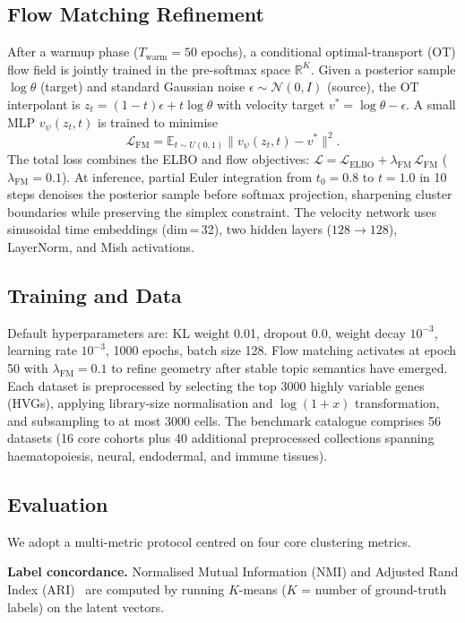 \documentclass[biology,article,submit,pdftex,moreauthors]{Definitions/mdpi}
\begin{document}
\subsection{Flow Matching Refinement}
After a warmup phase ($T_\text{warm}{=}50$ epochs), a conditional optimal-transport (OT) flow field is jointly trained in the pre-softmax space $\mathbb{R}^K$. Given a posterior sample $\log\theta$ (target) and standard Gaussian noise $\epsilon \sim \mathcal{N}(0,I)$ (source), the OT interpolant is $z_t = (1{-}t)\epsilon + t\log\theta$ with velocity target $v^* = \log\theta - \epsilon$. A small MLP $v_\psi(z_t, t)$ is trained to minimise
\[
  \mathcal{L}_\text{FM} = \mathbb{E}_{t\sim U(0,1)} \bigl\| v_\psi(z_t, t) - v^* \bigr\|^2.
\]
The total loss combines the ELBO and flow objectives: $\mathcal{L} = \mathcal{L}_\text{ELBO} + \lambda_\text{FM}\,\mathcal{L}_\text{FM}$ ($\lambda_\text{FM}{=}0.1$). At inference, partial Euler integration from $t_0{=}0.8$ to $t{=}1.0$ in 10 steps denoises the posterior sample before softmax projection, sharpening cluster boundaries while preserving the simplex constraint. The velocity network uses sinusoidal time embeddings (dim\,=\,32), two hidden layers ($128 \to 128$), LayerNorm, and Mish activations.

\subsection{Training and Data}
Default hyperparameters are: KL weight 0.01, dropout 0.0, weight decay $10^{-3}$, learning rate $10^{-3}$, 1000 epochs, batch size 128. Flow matching activates at epoch 50 with $\lambda_\text{FM}{=}0.1$ to refine geometry after stable topic semantics have emerged. Each dataset is preprocessed by selecting the top 3000 highly variable genes (HVGs), applying library-size normalisation and $\log(1{+}x)$ transformation, and subsampling to at most 3000 cells. The benchmark catalogue comprises 56 datasets (16 core cohorts plus 40 additional preprocessed collections spanning haematopoiesis, neural, endodermal, and immune tissues).

\subsection{Evaluation}
We adopt a multi-metric protocol centred on four core clustering metrics.

\textbf{Label concordance.}
Normalised Mutual Information (NMI) and Adjusted Rand Index (ARI)~\cite{hubert1985comparing} are computed by running $K$-means ($K$ = number of ground-truth labels) on the latent vectors.
\end{document}
